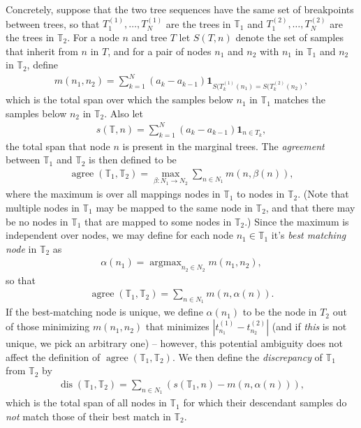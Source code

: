 \documentclass[10pt,twoside,lineno]{gsajnl}
\newcommand{\T}{\mathbb{T}}
\newcommand{\ind}{\mathbf{1}}
\newcommand{\argmax}{\operatorname{argmax}}
\newcommand{\dis}{\operatorname{dis}}
\newcommand{\agree}{\operatorname{agree}}
\begin{document}
Concretely, suppose that the two tree sequences have the same set of breakpoints
between trees,
so that $T_1^{(1)}, \ldots, T_N^{(1)}$ are the trees in $\T_1$
and $T_1^{(2)}, \ldots, T_N^{(2)}$ are the trees in $\T_2$.
For a node $n$ and tree $T$
let $S(T, n)$ denote the set of samples that inherit from $n$ in $T$,
and for a pair of nodes $n_1$ and $n_2$ with $n_1$ in $\T_1$ and $n_2$ in $\T_2$,
define
\begin{align*}
    m(n_1, n_2)
    =
    \sum_{k=1}^N (a_k - a_{k-1}) \ind_{S(T^{(1)}_k(n_1) = S(T^{(2)}_k(n_2)} ,
\end{align*}
which is the total span over which the samples below $n_1$ in $\T_1$
matches the samples below $n_2$ in $\T_2$.
Also let
\begin{align*}
    s(\T, n) = \sum_{k=1}^N (a_k - a_{k-1}) \ind_{n \in T_k} ,
\end{align*}
the total span that node $n$ is present in the marginal trees.
The \emph{agreement} between $\T_1$ and $\T_2$ is then defined to be
\begin{align*}
    \agree(\T_1, \T_2)
    =
    \max_{\beta:N_1 \to N_2} \sum_{n \in N_1} m(n, \beta(n)) ,
\end{align*}
where the maximum is over all mappings nodes in $\T_1$ to nodes in $\T_2$.
(Note that multiple nodes in $\T_1$ may be mapped to the same node in $\T_2$,
and that there may be no nodes in $\T_1$ that are mapped to some nodes in $\T_2$.)
Since the maximum is independent over nodes, we may define for each node $n_1 \in \T_1$
it's \emph{best matching node} in $\T_2$ as
\begin{align*}
    \alpha(n_1) = \argmax_{n_2 \in N_2} m(n_1, n_2) ,
\end{align*}
so that
\begin{align*}
    \agree(\T_1, \T_2)
    =
    \sum_{n \in N_1} m(n, \alpha(n)) .
\end{align*}
If the best-matching node is unique, we define $\alpha(n_1)$ to be the node in $T_2$
out of those minimizing $m(n_1, n_2)$ that minimizes $|t^{(1)}_{n_1} - t^{(2)}_{n_2}|$
(and if \emph{this} is not unique, we pick an arbitrary one) --
however, this potential ambiguity does not affect the definition of $\agree(\T_1, \T_2)$.
We then define the \emph{discrepancy} of $\T_1$ from $\T_2$ by
\begin{align*}
    \dis(\T_1, \T_2)
    =
    \sum_{n \in N_1} (s(\T_1, n) - m(n, \alpha(n))) ,
\end{align*}
which is the total span of all nodes in $\T_1$
for which their descendant samples do \emph{not} match those of their best match in $\T_2$.
\end{document}
